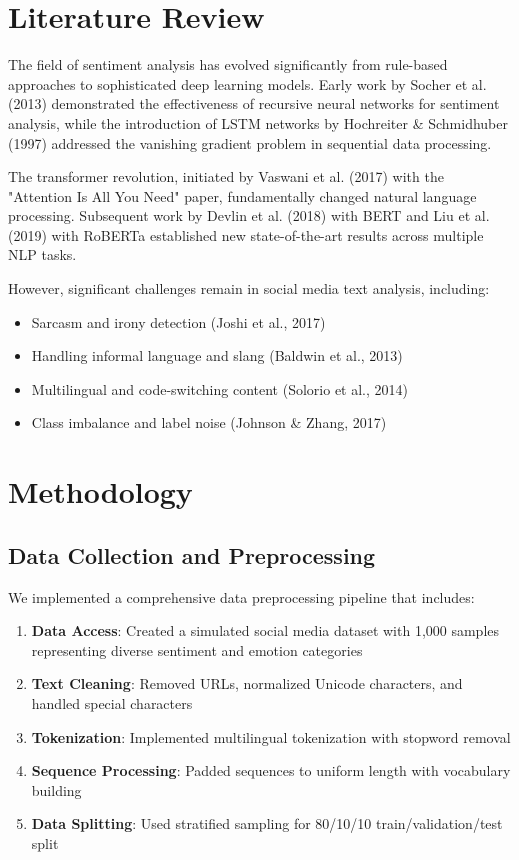 \documentclass[11pt,a4paper]{article}
\begin{document}
\section{Literature Review}

The field of sentiment analysis has evolved significantly from rule-based approaches to sophisticated deep learning models. Early work by Socher et al. (2013) demonstrated the effectiveness of recursive neural networks for sentiment analysis, while the introduction of LSTM networks by Hochreiter \& Schmidhuber (1997) addressed the vanishing gradient problem in sequential data processing.

The transformer revolution, initiated by Vaswani et al. (2017) with the "Attention Is All You Need" paper, fundamentally changed natural language processing. Subsequent work by Devlin et al. (2018) with BERT and Liu et al. (2019) with RoBERTa established new state-of-the-art results across multiple NLP tasks.

However, significant challenges remain in social media text analysis, including:
\begin{itemize}
    \item Sarcasm and irony detection (Joshi et al., 2017)
    \item Handling informal language and slang (Baldwin et al., 2013)
    \item Multilingual and code-switching content (Solorio et al., 2014)
    \item Class imbalance and label noise (Johnson \& Zhang, 2017)
\end{itemize}

\section{Methodology}

\subsection{Data Collection and Preprocessing}

We implemented a comprehensive data preprocessing pipeline that includes:

\begin{enumerate}
    \item \textbf{Data Access}: Created a simulated social media dataset with 1,000 samples representing diverse sentiment and emotion categories
    \item \textbf{Text Cleaning}: Removed URLs, normalized Unicode characters, and handled special characters
    \item \textbf{Tokenization}: Implemented multilingual tokenization with stopword removal
    \item \textbf{Sequence Processing}: Padded sequences to uniform length with vocabulary building
    \item \textbf{Data Splitting}: Used stratified sampling for 80/10/10 train/validation/test split
\end{enumerate}
\end{document}
